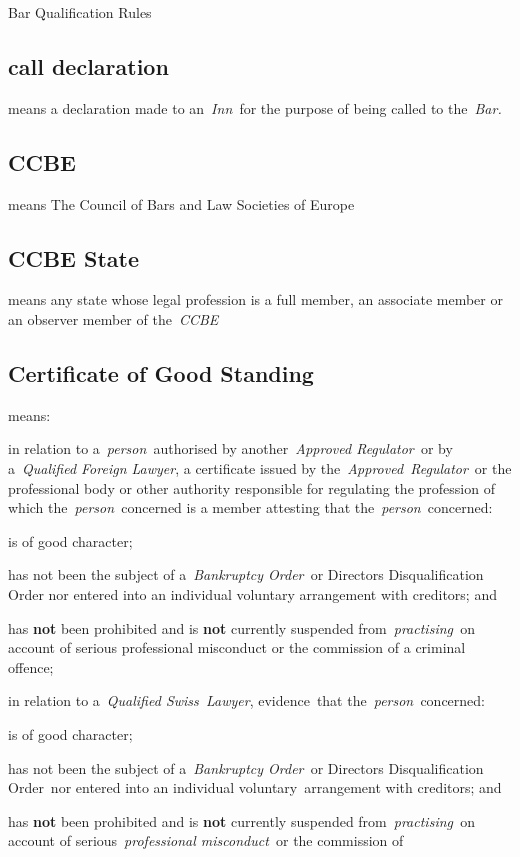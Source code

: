   Bar Qualification Rules  \subsection{call declaration } means a declaration made to
  an~\emph{Inn~}for the purpose of being called to the~\emph{Bar.} \subsection{CCBE } means The Council of Bars and Law Societies of
  Europe  \subsection{CCBE State } means any state whose legal profession is a full
  member, an associate member or an observer member of
  the~\emph{CCBE} \subsection{Certificate of Good Standing } means: \al \item in relation to
  a~\emph{person~}authorised by another~\emph{Approved Regulator~}or by
  a~\emph{Qualified Foreign Lawyer}, a certificate issued by
  the~\emph{Approved~Regulator}~or the professional body or other
  authority responsible for regulating the profession of which
  the~\emph{person~}concerned is a member attesting that
  the~\emph{person}~concerned: \rl \item is of good character; \item has not
  been the subject of a~\emph{Bankruptcy Order~}or Directors
  Disqualification Order nor entered into an individual voluntary
  arrangement with creditors; and \item has \textbf{not} been prohibited and is
  \textbf{not} currently suspended from~\emph{practising~}on account of serious
  professional misconduct or the commission of a criminal offence;\lr \item
  in relation to a~\emph{Qualified Swiss~Lawyer}, evidence~that
  the~\emph{person~}concerned: \rl \item is of good character; \item has not
  been the subject of a~\emph{Bankruptcy Order~}or Directors
  Disqualification Order~nor entered into an individual
  voluntary~arrangement with creditors; and \item has \textbf{not} been
  prohibited and is \textbf{not} currently suspended from~\emph{practising~}on
  account of serious~\emph{professional misconduct~}or the commission of
